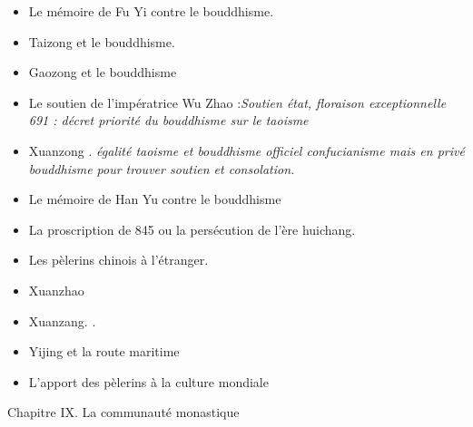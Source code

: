     \begin{itemize}
        \item Le mémoire de Fu Yi contre le bouddhisme.
        \item Taizong et le bouddhisme.
        \item Gaozong et le bouddhisme
        \item Le soutien de l'impératrice Wu Zhao :\textit{Soutien état, floraison exceptionnelle 691 : décret  priorité du bouddhisme sur le taoisme}
        \item Xuanzong . \textit{égalité taoisme et bouddhisme  officiel confucianisme mais en privé bouddhisme pour trouver soutien et consolation.}
        \item Le mémoire de Han Yu contre le bouddhisme
        \item La proscription de 845 ou la persécution de l'ère huichang.
        \item Les pèlerins chinois à l'étranger.
        \item Xuanzhao
        \item Xuanzang. .
        \item Yijing et la route maritime
        \item L'apport des pèlerins à la culture mondiale
    \end{itemize}

Chapitre IX. La communauté monastique

